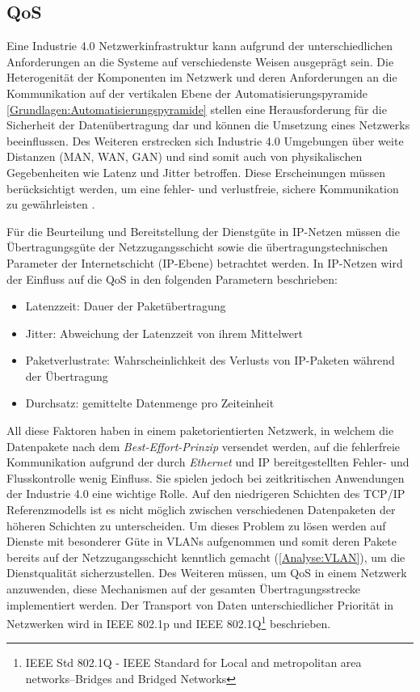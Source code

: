 \subsection{\ac{QoS}}
Eine Industrie 4.0 Netzwerkinfrastruktur kann aufgrund der unterschiedlichen Anforderungen an die Systeme auf verschiedenste Weisen ausgeprägt sein. Die Heterogenität der Komponenten im Netzwerk und deren Anforderungen an die Kommunikation auf der vertikalen Ebene der Automatisierungspyramide \autoref{Grundlagen:Automatisierungspyramide} stellen eine Herausforderung für die Sicherheit der Datenübertragung dar und können die Umsetzung eines Netzwerks beeinflussen. Des Weiteren erstrecken sich Industrie 4.0 Umgebungen über weite Distanzen (\ac{MAN}, \ac{WAN}, \ac{GAN}) und sind somit auch von physikalischen Gegebenheiten wie Latenz und Jitter betroffen. Diese Erscheinungen müssen berücksichtigt werden, um eine fehler- und verlustfreie, sichere Kommunikation zu gewährleisten \cite{torscht2014}.

Für die Beurteilung und Bereitstellung der Dienstgüte in \ac{IP}-Netzen müssen die Übertragungsgüte der Netzzugangsschicht sowie die übertragungstechnischen Parameter der Internetschicht (\ac{IP}-Ebene) betrachtet werden. In IP-Netzen wird der Einfluss auf die \ac{QoS} in den folgenden Parametern beschrieben:
\begin{itemize}
    \item Latenzzeit: Dauer der Paketübertragung
    \item Jitter: Abweichung der Latenzzeit von ihrem Mittelwert
    \item Paketverlustrate: Wahrscheinlichkeit des Verlusts von IP-Paketen während der Übertragung
    \item Durchsatz: gemittelte Datenmenge pro Zeiteinheit
\end{itemize}
All diese Faktoren haben in einem paketorientierten Netzwerk, in welchem die Datenpakete nach dem \textit{Best-Effort-Prinzip} versendet werden, auf die fehlerfreie Kommunikation aufgrund der durch \textit{Ethernet} und \ac{IP} bereitgestellten Fehler- und Flusskontrolle wenig Einfluss. Sie spielen jedoch bei zeitkritischen Anwendungen der Industrie 4.0 eine wichtige Rolle. Auf den niedrigeren Schichten des \ac{TCP}/\ac{IP} Referenzmodells ist es nicht möglich zwischen verschiedenen Datenpaketen der höheren Schichten zu unterscheiden. Um dieses Problem zu lösen werden auf Dienste mit besonderer Güte in \ac{VLAN}s aufgenommen und somit deren Pakete bereits auf der Netzzugangsschicht kenntlich gemacht (\autoref{Analyse:VLAN}), um die Dienstqualität sicherzustellen. Des Weiteren müssen, um \ac{QoS} in einem Netzwerk anzuwenden, diese Mechanismen auf der gesamten Übertragungsstrecke implementiert werden. Der Transport von Daten unterschiedlicher Priorität in Netzwerken wird in \ac{IEEE} 802.1p und \ac{IEEE} 802.1Q\footnote{IEEE Std 802.1Q - IEEE Standard for Local and metropolitan area networks--Bridges and Bridged Networks} beschrieben.

